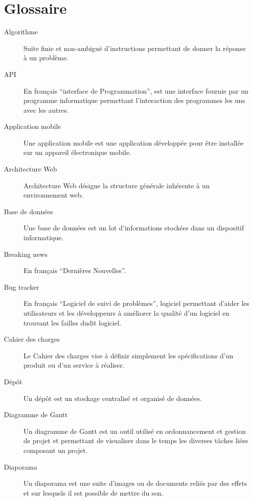 \documentclass{life-fr}
\begin{document}
\newpage

\section{Glossaire}


\begin{description}
\item[Algorithme]
Suite finie et non-ambiguë d’instructions permettant de donner la réponse à un problème.
\item[API]
En français ``interface de Programmation'', est une interface fournie par un programme informatique permettant l'interaction des programmes les uns avec les autres.

\item[Application mobile]
Une application mobile est une application développée pour être installée sur un appareil électronique mobile.

\item[Architecture Web]
Architecture Web désigne la structure générale inhérente à un environnement web.

\item[Base de données]
Une base de données est un lot d'informations stockées dans un dispositif informatique.

\item[Breaking news]
En français ``Dernières Nouvelles''.

\item[Bug tracker]
En français ``Logiciel de suivi de problèmes'',  logiciel permettant d'aider les utilisateurs et les développeurs à améliorer la qualité d'un logiciel en trouvant les failles dudit logiciel.

\item[Cahier des charges]
Le Cahier des charges vise à définir simplement les spécifications d’un produit ou d’un service à réaliser.

\item[Dépôt]
Un dépôt est un stockage centralisé et organisé de données.

\item[Diagramme de Gantt]
Un diagramme de Gantt est un outil utilisé en ordonnancement et gestion de projet et permettant de visualiser dans le temps les diverses tâches liées composant un projet.

\item[Diaporama]
Un diaporama est une suite d’images ou de documents reliés par des effets et sur lesquels il est possible de mettre du son.


\end{description}
\end{document}
